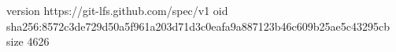 version https://git-lfs.github.com/spec/v1
oid sha256:8572c3de729d50a5f961a203d71d3c0eafa9a887123b46c609b25ae5c43295cb
size 4626
